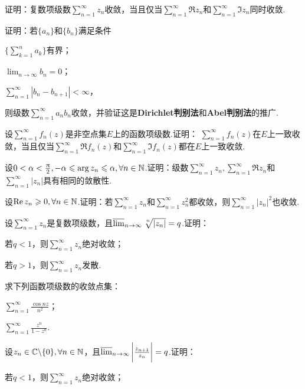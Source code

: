 \begin{xiti}
  \item 证明：复数项级数$\sum_{n=1}^\infty z_n$收敛，当且仅当$\sum_{n=1}^\infty \Re  z_n$和$\sum_{n=1}^\infty \Im z_n$同时收敛.
  \item 证明：若$\{a_n\}$和$\{b_n\}$满足条件
    \begin{enuma}
      \item $\bigg\{\sum_{k=1}^n a_k\bigg\}$有界；
      \item $\lim_{n\to\infty}b_n=0$；
      \item $\sum_{n=1}^\infty|b_n-b_{n+1}|<\infty$，
    \end{enuma}
    则级数$\sum_{n=1}^\infty a_nb_n$收敛，并验证这是\textbf{Dirichlet判别法}和\textbf{Abel判别法}的推广.
  \item 设$\sum_{n=1}^\infty f_n(z)$是非空点集$E$上的函数项级数.证明：
    $\sum_{n=1}^\infty f_n(z)$在$E$上一致收敛，当且仅当$\sum_{n=1}^\infty\Re f_n(z)$和$\sum_{n=1}^\infty\Im f_n(z)$都在$E$上一致收敛.
  \item 设$0<\alpha<\frac{\uppi}2,-\alpha\leqslant\arg z_n\leqslant\alpha,\forall n\in \mathbb N$.证明：级数$\sum_{n=1}^\infty z_n,\sum_{n=1}^\infty\Re z_n$和$\sum_{n=1}^\infty|z_n|$具有相同的敛散性.
  \item 设$\operatorname{Re} z_n\geqslant0,\forall n\in \mathbb N$.证明：若$\sum_{n=1}^\infty z_n$和$\sum_{n=1}^\infty z_n^2$都收敛，则$\sum_{n=1}^\infty|z_n|^2$也收敛.
  \item 设$\sum_{n=1}^\infty z_n$是复数项级数，且$\varlimsup_{n\to\infty}\sqrt[\leftroot{-1}\uproot{2}n]{|z_n|}=q$.证明：
    \begin{enuma}
      \item 若$q<1$，则$\sum_{n=1}^\infty z_n$绝对收敛；
      \item 若$q>1$，则$\sum_{n=1}^\infty z_n$发散.
    \end{enuma}
  \item 求下列函数项级数的收敛点集：
    \begin{enuma}
      \item $\sum_{n=1}^\infty\frac{\cos nz}{n^2}$；
      \item $\sum_{n=1}^\infty\frac{z^n}{1-z^n}$.
    \end{enuma}
  \item 设$z_n\in\mathbb C\backslash\{0\},\forall n\in \mathbb N$，且$\varlimsup_{n\to\infty}\bigg|\frac{z_{n+1}}{z_n}\bigg|=q$.证明：
    \begin{enuma}
      \item 若$q<1$，则$\sum_{n=1}^\infty z_n$绝对收敛；

\end{enuma}
\end{xiti}
